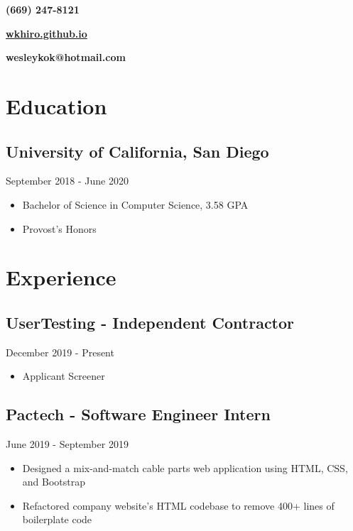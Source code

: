\documentclass{article}
\makeatletter
\renewcommand{\maketitle}
{
{\noindent\fontsize{40pt}{0pt}\selectfont\bf\color{DarkMidnightBlue} \theauthor} 

{\vspace{-1em}\hfill\large\bf (669) 247-8121}

{\noindent\Huge \href{https://github.com/WKhiro}{\faGithub} \href{https://www.linkedin.com/in/wesley-kok/}{\color{Aquamarine}\faLinkedinSquare}\enspace\large\bf \href{https://wkhiro.github.io/}{\color{NavyBlue} wkhiro.github.io}}

{\vspace{-1.5em}\hfill\large\bf wesleykok@hotmail.com}

}
\makeatother
\begin{document}
\author{Wesley Kok}
\maketitle 		%
\thispagestyle{empty} 	%
\large 			%

\section{Education}

\vspace{-0.5em}
\subsection{University of California, San Diego}\hfill {\color{Carmine}September 2018 - June 2020}
\begin{itemize}
	\itemsep0em
	\item Bachelor of Science in Computer Science, 3.58 GPA
	\item Provost's Honors
\end{itemize}

\vspace{-2em}
\section{Experience}

\vspace{-0.5em}
\subsection{UserTesting - Independent Contractor}\hfill {\color{Carmine}December 2019 - Present}
\begin{itemize}
	\item Applicant Screener
\end{itemize}

\vspace{-1em} 
\subsection{Pactech - Software Engineer Intern}\hfill {\color{Carmine}June 2019 - September 2019}
\begin{itemize}
	\itemsep0em
	\item Designed a mix-and-match cable parts web application using HTML, CSS, and Bootstrap
	\item Refactored company website's HTML codebase to remove 400+ lines of boilerplate code
\end{itemize}
\vspace{1.5em}
\end{document}

